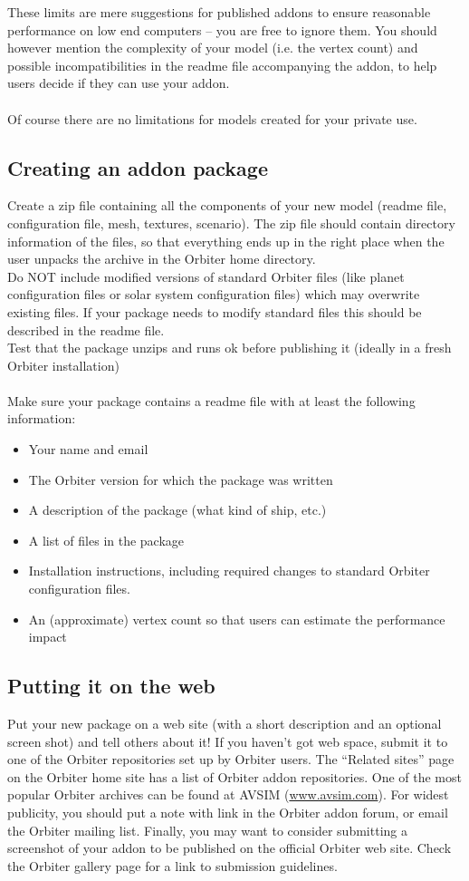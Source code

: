 \documentclass[Orbiter Developer Manual.tex]{subfiles}
\begin{document}
\noindent
These limits are mere suggestions for published addons to ensure reasonable performance on low end computers – you are free to ignore them. You should however mention the complexity of your model (i.e. the vertex count) and possible incompatibilities in the readme file accompanying the addon, to help users decide if they can use your addon.\\
\\
Of course there are no limitations for models created for your private use.


\subsection{Creating an addon package}
Create a zip file containing all the components of your new model (readme file, configuration file, mesh, textures, scenario). The zip file should contain directory information of the files, so that everything ends up in the right place when the user unpacks the archive in the Orbiter home directory.\\
Do NOT include modified versions of standard Orbiter files (like planet configuration files or solar system configuration files) which may overwrite existing files. If your package needs to modify standard files this should be described in the readme file.\\
Test that the package unzips and runs ok before publishing it (ideally in a fresh Orbiter installation)\\
\\
Make sure your package contains a readme file with at least the following information:

\begin{itemize}
\item Your name and email
\item The Orbiter version for which the package was written
\item A description of the package (what kind of ship, etc.)
\item A list of files in the package
\item Installation instructions, including required changes to standard Orbiter configuration files.
\item An (approximate) vertex count so that users can estimate the performance impact
\end{itemize}

\subsection{Putting it on the web}
Put your new package on a web site (with a short description and an optional screen shot) and tell others about it! If you haven’t got web space, submit it to one of the Orbiter repositories set up by Orbiter users. The “Related sites” page on the Orbiter home site has a list of Orbiter addon repositories. One of the most popular Orbiter archives can be found at AVSIM (\url{www.avsim.com}). For widest publicity, you should put a note with link in the Orbiter addon forum, or email the Orbiter mailing list. Finally, you may want to consider submitting a screenshot of your addon to be published on the official Orbiter web site. Check the Orbiter gallery page for a link to submission guidelines.
\end{document}
